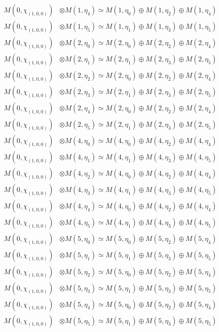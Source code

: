 \begin{align*}
M(0,\chi_{(1,0,0)}) &\otimes M(1,\eta_{4}) \simeq M(1,\eta_{0}) \oplus M(1,\eta_{2}) \oplus M(1,\eta_{4}) \\
M(0,\chi_{(1,0,0)}) &\otimes M(1,\eta_{5}) \simeq M(1,\eta_{1}) \oplus M(1,\eta_{3}) \oplus M(1,\eta_{5}) \\
M(0,\chi_{(1,0,0)}) &\otimes M(2,\eta_{0}) \simeq M(2,\eta_{0}) \oplus M(2,\eta_{2}) \oplus M(2,\eta_{4}) \\
M(0,\chi_{(1,0,0)}) &\otimes M(2,\eta_{1}) \simeq M(2,\eta_{1}) \oplus M(2,\eta_{3}) \oplus M(2,\eta_{5}) \\
M(0,\chi_{(1,0,0)}) &\otimes M(2,\eta_{2}) \simeq M(2,\eta_{0}) \oplus M(2,\eta_{2}) \oplus M(2,\eta_{4}) \\
M(0,\chi_{(1,0,0)}) &\otimes M(2,\eta_{3}) \simeq M(2,\eta_{1}) \oplus M(2,\eta_{3}) \oplus M(2,\eta_{5}) \\
M(0,\chi_{(1,0,0)}) &\otimes M(2,\eta_{4}) \simeq M(2,\eta_{0}) \oplus M(2,\eta_{2}) \oplus M(2,\eta_{4}) \\
M(0,\chi_{(1,0,0)}) &\otimes M(2,\eta_{5}) \simeq M(2,\eta_{1}) \oplus M(2,\eta_{3}) \oplus M(2,\eta_{5}) \\
M(0,\chi_{(1,0,0)}) &\otimes M(4,\eta_{0}) \simeq M(4,\eta_{0}) \oplus M(4,\eta_{2}) \oplus M(4,\eta_{4}) \\
M(0,\chi_{(1,0,0)}) &\otimes M(4,\eta_{1}) \simeq M(4,\eta_{1}) \oplus M(4,\eta_{3}) \oplus M(4,\eta_{5}) \\
M(0,\chi_{(1,0,0)}) &\otimes M(4,\eta_{2}) \simeq M(4,\eta_{0}) \oplus M(4,\eta_{2}) \oplus M(4,\eta_{4}) \\
M(0,\chi_{(1,0,0)}) &\otimes M(4,\eta_{3}) \simeq M(4,\eta_{1}) \oplus M(4,\eta_{3}) \oplus M(4,\eta_{5}) \\
M(0,\chi_{(1,0,0)}) &\otimes M(4,\eta_{4}) \simeq M(4,\eta_{0}) \oplus M(4,\eta_{2}) \oplus M(4,\eta_{4}) \\
M(0,\chi_{(1,0,0)}) &\otimes M(4,\eta_{5}) \simeq M(4,\eta_{1}) \oplus M(4,\eta_{3}) \oplus M(4,\eta_{5}) \\
M(0,\chi_{(1,0,0)}) &\otimes M(5,\eta_{0}) \simeq M(5,\eta_{0}) \oplus M(5,\eta_{2}) \oplus M(5,\eta_{4}) \\
M(0,\chi_{(1,0,0)}) &\otimes M(5,\eta_{1}) \simeq M(5,\eta_{1}) \oplus M(5,\eta_{3}) \oplus M(5,\eta_{5}) \\
M(0,\chi_{(1,0,0)}) &\otimes M(5,\eta_{2}) \simeq M(5,\eta_{0}) \oplus M(5,\eta_{2}) \oplus M(5,\eta_{4}) \\
M(0,\chi_{(1,0,0)}) &\otimes M(5,\eta_{3}) \simeq M(5,\eta_{1}) \oplus M(5,\eta_{3}) \oplus M(5,\eta_{5}) \\
M(0,\chi_{(1,0,0)}) &\otimes M(5,\eta_{4}) \simeq M(5,\eta_{0}) \oplus M(5,\eta_{2}) \oplus M(5,\eta_{4}) \\
M(0,\chi_{(1,0,0)}) &\otimes M(5,\eta_{5}) \simeq M(5,\eta_{1}) \oplus M(5,\eta_{3}) \oplus M(5,\eta_{5}) \\
\end{align*}

